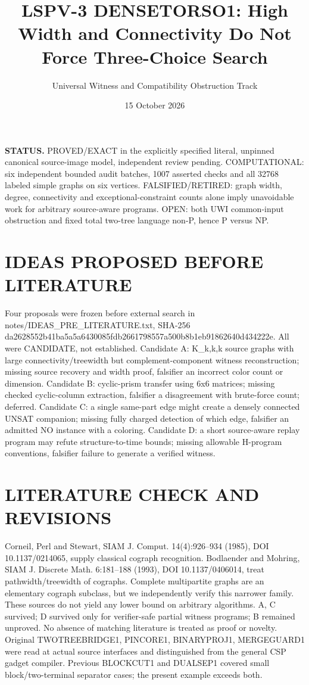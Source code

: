 \documentclass[11pt]{article}
\title{LSPV-3 DENSETORSO1: High Width and Connectivity Do Not Force Three-Choice Search}
\author{Universal Witness and Compatibility Obstruction Track}
\date{15 October 2026}
\begin{document}
\maketitle
\noindent\textbf{STATUS.} PROVED/EXACT in the explicitly specified literal, unpinned canonical source-image model, independent review pending. COMPUTATIONAL: six independent bounded audit batches, 1007 asserted checks and all 32768 labeled simple graphs on six vertices. FALSIFIED/RETIRED: graph width, degree, connectivity and exceptional-constraint counts alone imply unavoidable work for arbitrary source-aware programs. OPEN: both UWI common-input obstruction and fixed total two-tree language non-P, hence P versus NP.

\section{IDEAS PROPOSED BEFORE LITERATURE}
Four proposals were frozen before external search in notes/IDEAS_PRE_LITERATURE.txt, SHA-256 da2628552b41ba5a5a6430085fdb2661798557a500b8b1eb91862640d434222e. All were CANDIDATE, not established. Candidate A: K_{k,k,k} source graphs with large connectivity/treewidth but complement-component witness reconstruction; missing source recovery and width proof, falsifier an incorrect color count or dimension. Candidate B: cyclic-prism transfer using 6x6 matrices; missing checked cyclic-column extraction, falsifier a disagreement with brute-force count; deferred. Candidate C: a single same-part edge might create a densely connected UNSAT companion; missing fully charged detection of which edge, falsifier an admitted NO instance with a coloring. Candidate D: a short source-aware replay program may refute structure-to-time bounds; missing allowable H-program conventions, falsifier failure to generate a verified witness.

\section{LITERATURE CHECK AND REVISIONS}
Corneil, Perl and Stewart, SIAM J. Comput. 14(4):926--934 (1985), DOI 10.1137/0214065, supply classical cograph recognition. Bodlaender and Mohring, SIAM J. Discrete Math. 6:181--188 (1993), DOI 10.1137/0406014, treat pathwidth/treewidth of cographs. Complete multipartite graphs are an elementary cograph subclass, but we independently verify this narrower family. These sources do not yield any lower bound on arbitrary algorithms. A, C survived; D survived only for verifier-safe partial witness programs; B remained unproved. No absence of matching literature is treated as proof or novelty. Original TWOTREEBRIDGE1, PINCORE1, BINARYPROJ1, MERGEGUARD1 were read at actual source interfaces and distinguished from the general CSP gadget compiler. Previous BLOCKCUT1 and DUALSEP1 covered small block/two-terminal separator cases; the present example exceeds both.
\end{document}
